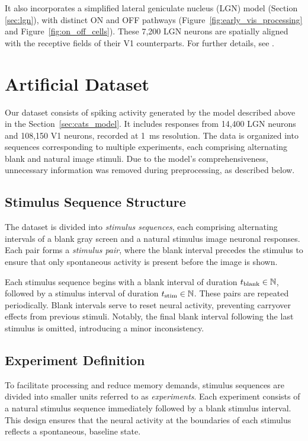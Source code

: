 It also incorporates a simplified lateral geniculate nucleus (LGN) model (Section \ref{sec:lgn}), with distinct ON and OFF pathways (Figure~\ref{fig:early_vis_processing} and Figure~\ref{fig:on_off_cells}). These 7,200 LGN neurons are spatially aligned with the receptive fields of their V1 counterparts. For further details, see \citet{antolik2024comprehensive}.

\section{Artificial Dataset}
\label{sec:artificial_dataset}
Our dataset consists of spiking activity generated by the model described above in the Section~\ref{sec:cats_model}. It includes responses from 14,400 LGN neurons and 108,150 V1 neurons, recorded at 1~ms resolution. The data is organized into sequences corresponding to multiple experiments, each comprising alternating blank and natural image stimuli. Due to the model's comprehensiveness, unnecessary information was removed during preprocessing, as described below.

\subsection{Stimulus Sequence Structure}
\label{subsec:stimulus_sequence}
The dataset is divided into \emph{stimulus sequences}, each comprising alternating intervals of a blank gray screen and a natural stimulus image neuronal responses. Each pair forms a \emph{stimulus pair}, where the blank interval precedes the stimulus to ensure that only spontaneous activity is present before the image is shown.

Each stimulus sequence begins with a blank interval of duration $t_{\text{blank}}\in \mathbb{N}$, followed by a stimulus interval of duration $t_{\text{stim}} \in \mathbb{N}$. These pairs are repeated periodically. Blank intervals serve to reset neural activity, preventing carryover effects from previous stimuli. Notably, the final blank interval following the last stimulus is omitted, introducing a minor inconsistency.

\subsection{Experiment Definition}
\label{subsec:experiment}
To facilitate processing and reduce memory demands, stimulus sequences are divided into smaller units referred to as \emph{experiments}. Each experiment consists of a natural stimulus sequence immediately followed by a blank stimulus interval. This design ensures that the neural activity at the boundaries of each stimulus reflects a spontaneous, baseline state.

